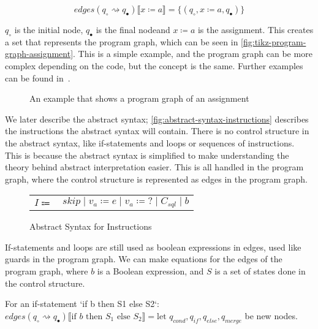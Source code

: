 \begin{equation}
    edges(q_{\circ} \rightsquigarrow q_{\bullet})\llbracket x\coloneqq a \rrbracket = \{(q_{\circ}, x\coloneqq a, q_{\bullet})\}\label{eq:equation3}
\end{equation}


$q_{\circ}$ is the initial node, $q_{\bullet}$ is the final node\coloneqq and $x\coloneqq a$ is the assignment.
This creates a set that represents the program graph, which can be seen in \autoref{fig:tikz-program-graph-assignment}.
This is a simple example, and the program graph can be more complex depending on the code, but the concept is the same.
Further examples can be found in~\cite[Figure 2.6]{nielson_formal_2019}.

\begin{figure}[htb!]
    \center
    
    \caption{An example that shows a program graph of an assignment}
    \label{fig:tikz-program-graph-assignment}
\end{figure}

We later describe the abstract syntax; \autoref{fig:abstract-syntax-instructions} describes the instructions the abstract syntax will contain.
There is no control structure in the abstract syntax, like if-statements and loops or sequences of instructions.
This is because the abstract syntax is simplified to make understanding the theory behind abstract interpretation easier.
This is all handled in the program graph, where the control structure is represented as edges in the program graph.

\begin{figure}
    \center
    \begin{tabular}{r l}
        $I \Coloneqq$ & $skip \mid v_a \coloneqq e \mid v_a \coloneqq ? \mid C_{sql} \mid b$
    \end{tabular}
    \caption{Abstract Syntax for Instructions}
    \label{fig:abstract-syntax-instructions}
\end{figure}

If-statements and loops are still used as boolean expressions in edges, used like guards in the program graph.
We can make equations for the edges of the program graph, where $b$ is a Boolean expression, and $S$ is a set of states done in the control structure.

For an if-statement `if b then S1 else S2`:
$edges(q_{\circ} \rightsquigarrow q_{\bullet})\llbracket \text{if } b \text{ then } S_1 \text{ else } S_2 \rrbracket = \text{let } q_{cond}, q_{if}, q_{else}, q_{merge}$ be new nodes.


